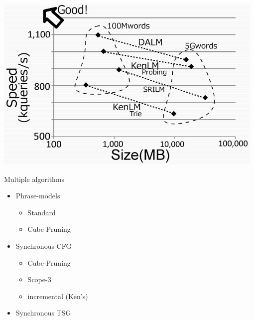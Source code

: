 \documentclass[landscape]{uedslides2C}
\begin{document}
\begin{center} 
\includegraphics[scale=1.0]{DALM.png}\vspace{-20mm}
\end{center}



Multiple algorithms
\begin{itemize}
  \item Phrase-models
    \begin{itemize}
    \item Standard
    \item Cube-Pruning
    \end{itemize}
  \item Synchronous CFG
    \begin{itemize}
    \item Cube-Pruning
    \item Scope-3
    \item incremental (Ken's)
    \end{itemize}
  \item Synchronous TSG
  
\end{itemize}
\end{document}
